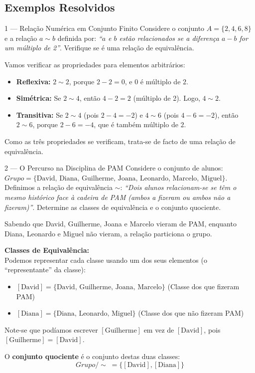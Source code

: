 \subsection{Exemplos Resolvidos}

\begin{exbox}{1 --- Relação Numérica em Conjunto Finito}
  Considere o conjunto $A = \{2, 4, 6, 8\}$ e a relação $a \sim b$ definida por: \textit{``$a$ e $b$ estão relacionados se a diferença $a - b$ for um múltiplo de 2''}. Verifique se é uma relação de equivalência.
\end{exbox}
\begin{solbox}
  Vamos verificar as propriedades para elementos arbitrários:
  \begin{itemize}
      \item \textbf{Reflexiva:} $2 \sim 2$, porque $2 - 2 = 0$, e $0$ é múltiplo de $2$. \checkmark
      \item \textbf{Simétrica:} Se $2 \sim 4$, então $4 - 2 = 2$ (múltiplo de 2). Logo, $4 \sim 2$. \checkmark
      \item \textbf{Transitiva:} Se $2 \sim 4$ (pois $2-4=-2$) e $4 \sim 6$ (pois $4-6=-2$), então $2 \sim 6$, porque $2 - 6 = -4$, que é também múltiplo de $2$. \checkmark
  \end{itemize}
  Como as três propriedades se verificam, trata-se de facto de uma relação de equivalência.
\end{solbox}

\begin{exbox}{2 --- O Percurso na Disciplina de PAM}
  Considere o conjunto de alunos: \\
  $Grupo = \{\text{David, Diana, Guilherme, Joana, Leonardo, Marcelo, Miguel}\}$. \\
  Definimos a relação de equivalência $\sim$: \textit{``Dois alunos relacionam-se se têm o mesmo histórico face à cadeira de PAM (ambos a fizeram ou ambos não a fizeram)''}. Determine as classes de equivalência e o conjunto quociente.
\end{exbox}
\begin{solbox}
  Sabendo que David, Guilherme, Joana e Marcelo vieram de PAM, enquanto Diana, Leonardo e Miguel não vieram, a relação particiona o grupo.

  \textbf{Classes de Equivalência:} \\
  Podemos representar cada classe usando um dos seus elementos (o ``representante'' da classe):
  \begin{itemize}
      \item $[\text{David}] = \{\text{David, Guilherme, Joana, Marcelo}\}$ (Classe dos que fizeram PAM)
      \item $[\text{Diana}] = \{\text{Diana, Leonardo, Miguel}\}$ (Classe dos que não fizeram PAM)
  \end{itemize}
  Note-se que podíamos escrever $[\text{Guilherme}]$ em vez de $[\text{David}]$, pois $[\text{Guilherme}] = [\text{David}]$. 
  
  O \textbf{conjunto quociente} é o conjunto destas duas classes:
  \[
      Grupo/\sim \; = \{ [\text{David}], [\text{Diana}] \}
  \]
\end{solbox}

